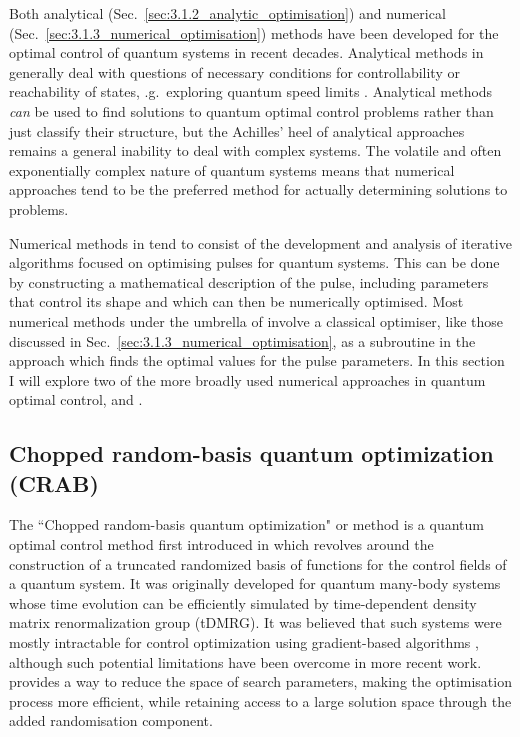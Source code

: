 Both analytical (Sec.~\ref{sec:3.1.2_analytic_optimisation}) and numerical (Sec.~\ref{sec:3.1.3_numerical_optimisation}) methods have been developed for the optimal control of quantum systems in recent decades. Analytical methods in  generally deal with questions of necessary conditions for controllability \cite{schirmer_complete_2001} or reachability of states, \@e.g.~exploring quantum speed limits \cite{khaneja_time_2001, hegerfeldt_driving_2013, poggi_quantum_2013}. Analytical methods \emph{can} be used to find solutions to quantum optimal control problems rather than just classify their structure, but the Achilles' heel of analytical approaches remains a general inability to deal with complex systems. The volatile and often exponentially complex nature of quantum systems means that numerical approaches tend to be the preferred method for actually determining solutions to  problems. 

Numerical methods in  tend to consist of the development and analysis of iterative algorithms focused on optimising pulses for quantum systems. This can be done by constructing a mathematical description of the pulse, including parameters that control its shape and which can then be numerically optimised. Most numerical methods under the umbrella of  involve a classical optimiser, like those discussed in Sec.~\ref{sec:3.1.3_numerical_optimisation}, as a subroutine in the approach which finds the optimal values for the pulse parameters. In this section I will explore two of the more broadly used numerical approaches in quantum optimal control,  and . 

\subsection{Chopped random-basis quantum optimization (CRAB)}\label{sec:3.3.1_CRAB}

The ``Chopped random-basis quantum optimization" or  method is a quantum optimal control method first introduced in \cite{doria_optimal_2011, caneva_chopped_2011} which revolves around the construction of a truncated randomized basis of functions for the control fields of a quantum system. It was originally developed for quantum many-body systems whose time evolution can be efficiently simulated by time-dependent density matrix renormalization group (tDMRG)\cite{white_density_1992, schollwock_density-matrix_2005, schollwock_density-matrix_2011}. It was believed that such systems were mostly intractable for control optimization using gradient-based algorithms \cite{brif_control_2010}, although such potential limitations have been overcome in more recent work\cite{jensen_approximate_2021}.  provides a way to reduce the space of search parameters, making the optimisation process more efficient, while retaining access to a large solution space through the added randomisation component.

